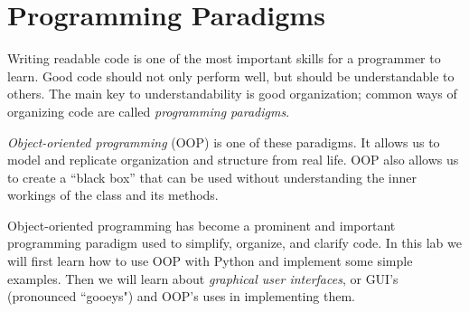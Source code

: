 \label{lab:OOP}

\section*{Programming Paradigms}

Writing readable code is one of the most important skills for a programmer to learn.
Good code should not only perform well, but should be understandable to others.
The main key to understandability is good organization; common ways of organizing code are called \emph{programming paradigms}.

\emph{Object-oriented programming} (OOP) is one of these paradigms.
It allows us to model and replicate organization and structure from real life.
OOP also allows us to create a ``black box'' that can be used without understanding the inner workings of the class and its methods.

Object-oriented programming has become a prominent and important programming paradigm used to simplify, organize, and clarify code.
In this lab we will first learn how to use OOP with Python and implement some simple examples.
Then we will learn about \emph{graphical user interfaces}, or GUI's (pronounced ``gooeys") and OOP's uses in implementing them.


\begin{comment}
A way of organizing a program is often called a ``paradigm."

Paradigms are designed to create better code by structuring or organizing the code in a more meaningful way.
Code without any structure is often referred to as ``spaghetti code.''
Spaghetti can be very easy to write, but very difficult to understand or modify.
\emph{Structured programming} emphasizes the use of programming structures to select or repeat the execution of blocks of code.
It is good practice to structure your programs in such a way that they are easy to understand, extend, or reuse.
Making extensive use of procedures (or subfunctions) is a characteristic of \emph{procedural programming}.
The work of the program is done in the subfunctions with one main function supervising the calling of each subfunction.

Another important, albeit specialized, paradigm is \li{object oriented programming} (or OOP).
The concept of object oriented programming is to model a problem as the interaction of a collection of objects.
There are many other paradigms such as declarative, event-driven, and array programming.
\end{comment}



